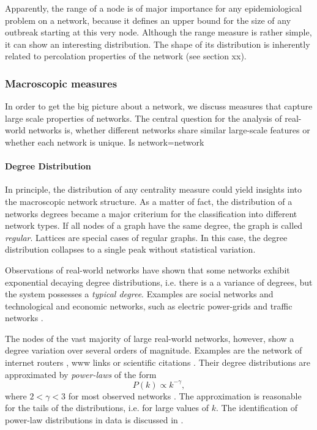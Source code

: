 \documentclass[openright,twoside,headsepline]{scrbook}
\begin{document}
Apparently, the range of a node is of major importance for any epidemiological problem on a network, because it defines an upper bound for the size of any outbreak starting at this very node. 
Although the range measure is rather simple, it can show an interesting distribution.
The shape of its distribution is inherently related to percolation properties of the network (see section xx).

\subsubsection{Macroscopic measures}\label{sec:macro_measures}
In order to get the big picture about a network, we discuss measures that capture large scale properties of networks.
The central question for the analysis of real-world networks is, whether different networks share similar large-scale features or whether each network is unique.
Is network=network\textbf{\textsf{\color{Cayenne}{?}}}

\paragraph{Degree Distribution\color{Cayenne}{.}}
In principle, the distribution of any centrality measure could yield insights into the macroscopic network structure.
As a matter of fact, the distribution of a networks degrees became a major criterium for the classification into different network types.
If all nodes of a graph have the same degree, the graph is called \emph{regular}.
Lattices are special cases of regular graphs.
In this case, the degree distribution collapses to a single peak without statistical variation.

Observations of real-world networks have shown that some networks exhibit exponential decaying degree distributions, i.e. there is a a variance of degrees, but the system possesses a \emph{typical degree}.
Examples are social networks and technological and economic networks, such as electric power-grids and traffic networks \citep{Amaral:2000,indian_railway}.

The nodes of the vast majority of large real-world networks, however, show a degree variation over several orders of magnitude.
Examples are the network of internet routers \citep{Faloutsos:1999}, www links \citep{Barabasi99} or scientific citations \citep{Price:1965}.
Their degree distributions are approximated by \emph{power-laws} of the form
\begin{equation}\label{eq:scale-free_distr}
P(k) \propto k^{-\gamma } ,
\end{equation}
where $2<\gamma <3$ for most observed networks \citep{all_scale_free_are_sparse,Newman2003}.
The approximation is reasonable for the tails of the distributions, i.e. for large values of $k$.
The identification of power-law distributions in data is discussed in \citep{Clauset:2009}.
\end{document}
